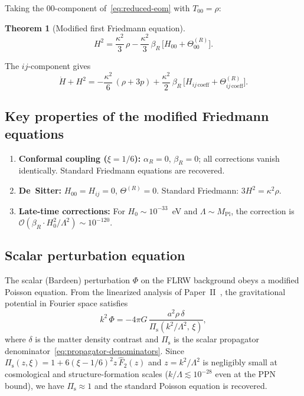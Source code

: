 \documentclass[12pt,a4paper]{article}
\newcommand{\Pis}{\Pi_{\mathrm{s}}}
\newcommand{\order}{\mathcal{O}}
\newcommand{\Lam}{\Lambda}
\theoremstyle{plain}
\newtheorem{theorem}{Theorem}[section]
\theoremstyle{definition}
\begin{document}
Taking the 00-component of~\eqref{eq:reduced-eom} with $T_{00} = \rho$:

\begin{theorem}[Modified first Friedmann equation]
\label{thm:friedmann-1}
\begin{equation}\label{eq:friedmann-1}
  \boxed{
  H^2 = \frac{\kappa^2}{3}\,\rho
  - \frac{\kappa^2}{3}\,\beta_R\,
  \bigl[H_{00} + \Theta^{(R)}_{00}\bigr].
  }
\end{equation}
\end{theorem}

\noindent
The $ij$-component gives
\begin{equation}\label{eq:friedmann-2}
  \dot{H} + H^2 = -\frac{\kappa^2}{6}\,(\rho + 3p)
  + \frac{\kappa^2}{2}\,\beta_R\,
  \bigl[H_{ij\,\mathrm{coeff}}
  + \Theta^{(R)}_{ij\,\mathrm{coeff}}\bigr].
\end{equation}

\subsection{Key properties of the modified Friedmann equations}

\begin{enumerate}[nosep]
  \item \textbf{Conformal coupling ($\xi = 1/6$):}
    $\alpha_R = 0$, $\beta_R = 0$; all corrections vanish identically.
    Standard Friedmann equations are recovered.

  \item \textbf{De~Sitter:}  $H_{00} = H_{ij} = 0$,
    $\Theta^{(R)} = 0$.  Standard Friedmann: $3H^2 = \kappa^2\rho$.

  \item \textbf{Late-time corrections:}  For $H_0 \sim 10^{-33}$~eV and
    $\Lam \sim M_{\mathrm{Pl}}$, the correction is
    $\order(\beta_R \cdot H_0^2/\Lam^2) \sim 10^{-120}$.
\end{enumerate}

\subsection{Scalar perturbation equation}

The scalar (Bardeen) perturbation $\Phi$ on the FLRW background obeys a
modified Poisson equation.  From the linearized analysis of
Paper~II~\cite{Alfyorov:2026ss}, the gravitational potential in Fourier
space satisfies
\begin{equation}\label{eq:poisson-mod-flrw}
  k^2\,\Phi = -4\pi G\,\frac{a^2\rho\,\delta}
  {\Pis(k^2/\Lam^2,\,\xi)},
\end{equation}
where $\delta$ is the matter density contrast and $\Pis$ is the scalar
propagator denominator~\eqref{eq:propagator-denominators}.  Since
$\Pis(z,\xi) = 1 + 6(\xi - 1/6)^2 z\,\hat{F}_2(z)$ and
$z = k^2/\Lam^2$ is negligibly small at cosmological and
structure-formation scales ($k/\Lam \lesssim 10^{-28}$ even at the PPN
bound), we have $\Pis \approx 1$ and the standard Poisson equation is
recovered.
\end{document}
